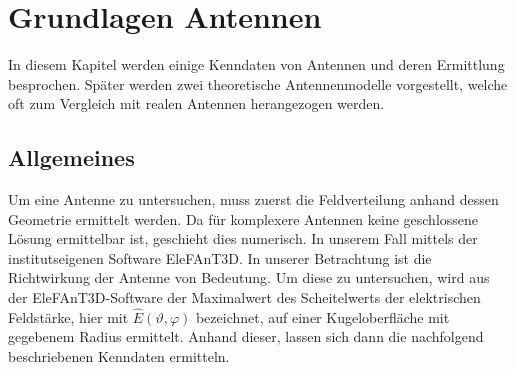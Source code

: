 \section{Grundlagen Antennen}
In diesem Kapitel werden einige Kenndaten von Antennen und deren Ermittlung besprochen. Später werden zwei theoretische Antennenmodelle vorgestellt, welche oft zum Vergleich mit realen Antennen herangezogen werden. 
\subsection{Allgemeines}
Um eine Antenne zu untersuchen, muss zuerst die Feldverteilung anhand dessen Geometrie ermittelt werden. 
Da für komplexere Antennen keine geschlossene Lösung ermittelbar ist, geschieht dies numerisch. In unserem Fall mittels der institutseigenen Software EleFAnT3D. \newline
In unserer Betrachtung ist die Richtwirkung der Antenne von Bedeutung. Um diese zu untersuchen, wird aus der EleFAnT3D-Software der Maximalwert des Scheitelwerts der elektrischen Feldstärke, hier mit $\hat{E}\left(\vartheta,\varphi \right)$ bezeichnet, auf einer Kugeloberfläche mit gegebenem Radius ermittelt. Anhand dieser, lassen sich dann die nachfolgend beschriebenen Kenndaten ermitteln.
